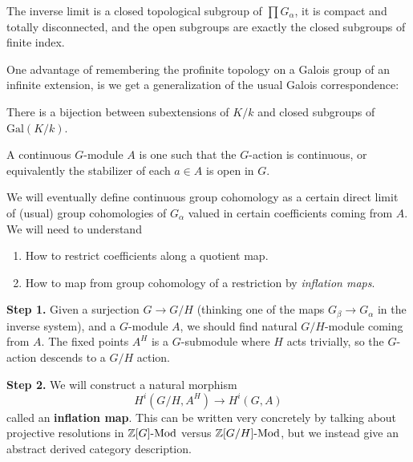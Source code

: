 \documentclass[12pt]{article}
\newcommand{\Gal}{\mathrm{Gal}}
\begin{document}
\begin{rmk}
    The inverse limit is a closed topological subgroup of $\prod G_\alpha$, it is compact and totally disconnected, and the open subgroups are exactly the closed subgroups of finite index.
\end{rmk}

One advantage of remembering the profinite topology on a Galois group of an infinite extension, is we get a generalization of the usual Galois correspondence:

\begin{thm}
    There is a bijection between subextensions of $K/k$ and closed subgroups of $\Gal(K/k)$.
\end{thm}

\begin{defn}
    A continuous $G$-module $A$ is one such that the $G$-action is continuous, or equivalently the stabilizer of each $a\in A$ is open in $G$.
\end{defn}

We will eventually define continuous group cohomology as a certain direct limit of (usual) group cohomologies of $G_\alpha$ valued in certain coefficients coming from $A$. We will need to understand
\begin{enumerate}
    \item How to restrict coefficients along a quotient map.
    \item How to map from group cohomology of a restriction by \textit{inflation maps}.
\end{enumerate}

\textbf{Step 1.} Given a surjection $G\to G/H$ (thinking one of the maps $G_\beta \to G_\alpha$ in the inverse system), and a $G$-module $A$, we should find natural $G/H$-module coming from $A$. The fixed points $A^H$ is a $G$-submodule where $H$ acts trivially, so the $G$-action descends to a $G/H$ action.

\textbf{Step 2.} We will construct a natural morphism
\[H^i(G/H, A^H) \to H^i(G, A)\]
called an \textbf{inflation map}. This can be written very concretely by talking about projective resolutions in $\mathbb{Z}[G]\text{-}\mathrm{Mod}$ versus $\mathbb{Z}[G/H]\text{-}\mathrm{Mod}$, but we instead give an abstract derived category description.
\end{document}
